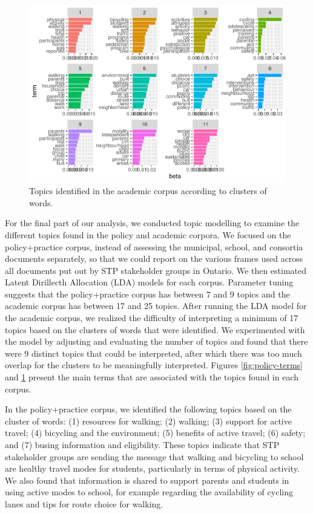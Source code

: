\documentclass[]{elsarticle} %
\begin{document}
\begin{figure}
\includegraphics[width=1\linewidth]{AST-Framing-Ontario_files/figure-latex/academic-terms-1} \caption{\label{fig:academic-terms}Topics identified in the academic corpus according to clusters of words.}\label{fig:academic-terms}
\end{figure}

For the final part of our analysis, we conducted topic modelling to
examine the different topics found in the policy and academic corpora.
We focused on the policy+practice corpus, instead of assessing the
municipal, school, and consortia documents separately, so that we could
report on the various frames used across all documents put out by STP
stakeholder groups in Ontario. We then estimated Latent Dirillecth
Allocation (LDA) models for each corpus. Parameter tuning suggests that
the policy+practice corpus has between 7 and 9 topics and the academic
corpus has between 17 and 25 topics. After running the LDA model for the
academic corpus, we realized the difficulty of interpreting a minimum of
17 topics based on the clusters of words that were identified. We
experimented with the model by adjusting and evaluating the number of
topics and found that there were 9 distinct topics that could be
interpreted, after which there was too much overlap for the clusters to
be meaningfully interpreted. Figures \ref{fig:policy-terms} and
\ref{fig:academic-terms} present the main terms that are associated with
the topics found in each corpus.

In the policy+practice corpus, we identified the following topics based
on the cluster of words: (1) resources for walking; (2) walking; (3)
support for active travel; (4) bicycling and the environment; (5)
benefits of active travel; (6) safety; and (7) busing information and
eligibility. These topics indicate that STP stakeholder groups are
sending the message that walking and bicycling to school are healthy
travel modes for students, particularly in terms of physical activity.
We also found that information is shared to support parents and students
in using active modes to school, for example regarding the availability
of cycling lanes and tips for route choice for walking.
\end{document}
